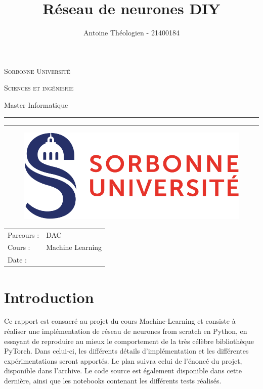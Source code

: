 \documentclass{article}
\title{Réseau de neurones DIY}
\author{Antoine Théologien - 21400184}
\newcommand{\program}{Master Informatique}
\newcommand{\parcours}{DAC}
\newcommand{\course}{Machine Learning}
\begin{document}
\begin{titlepage}
\makeatletter
\begin{center}
	\textsc{Sorbonne Université}
	\par \textsc{Sciences et ingénierie }
	\par \program

        \vfill
        \hrule height .08em \bigskip
	\par\huge\@title\bigskip
	\par\Large\@author\bigskip
	\hrule height .08em \normalsize

	\vfill
        \begin{figure}[H]
        \centering
        \includegraphics[width=0.8\linewidth]{Images/Logo_of_Sorbonne_University.svg.png}
        \label{fig:enter-label}
        \end{figure}
	\vfill

	\begin{tabular}{ll}
		\toprule
            Parcours : & \parcours\\
		Cours : & \course\\
		Date : & \@date\\
		\bottomrule
	\end{tabular}
	
	\vfill
\end{center}
\makeatother
\end{titlepage}

\section{Introduction}
Ce rapport est consacré au projet du cours Machine-Learning et consiste à réaliser une implémentation de réseau de neurones from scratch en Python, en essayant de reproduire au mieux le comportement de la très célèbre bibliothèque PyTorch. Dans celui-ci, les différents détails d'implémentation et les différentes expérimentations seront apportés. Le plan suivra celui de l'énoncé du projet, disponible dans l'archive. Le code source est également disponible dans cette dernière, ainsi que les notebooks contenant les différents tests réalisés.
\end{document}
